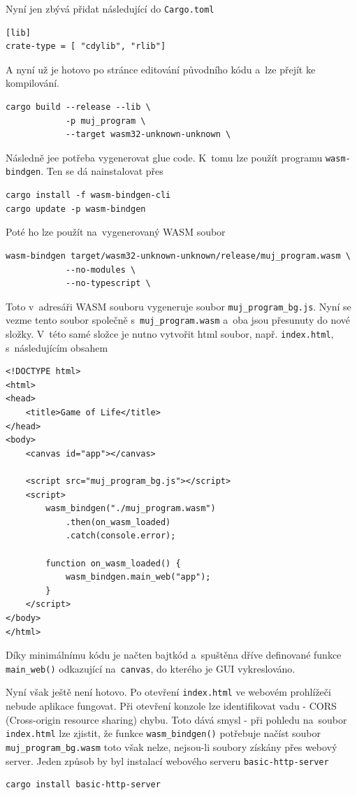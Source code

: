 \documentclass[a4paper, 12pt]{article} %
\newcommand{\rust}[1]{\texttt{#1}}
\begin{document}
		Nyní jen zbývá přidat následující do \texttt{Cargo.toml}
\begin{verbatim}
[lib]
crate-type = [ "cdylib", "rlib"]
		\end{verbatim}
		
		A nyní už je hotovo po stránce editování původního kódu a~lze přejít ke kompilování.
		\begin{verbatim}
cargo build --release --lib \
			-p muj_program \
			--target wasm32-unknown-unknown \
		\end{verbatim}
		
		Následně jee potřeba vygenerovat glue code. K~tomu lze použít programu \texttt{wasm-bindgen}. Ten se dá nainstalovat přes
		\begin{verbatim}
cargo install -f wasm-bindgen-cli
cargo update -p wasm-bindgen
		\end{verbatim}
		
		Poté ho lze použít na~vygenerovaný WASM soubor
		\begin{verbatim}
wasm-bindgen target/wasm32-unknown-unknown/release/muj_program.wasm \
			--no-modules \
			--no-typescript \
		\end{verbatim}
		
		Toto v~adresáři WASM souboru vygeneruje soubor \texttt{muj\_program\_bg.js}. Nyní se vezme tento soubor společně s~\texttt{muj\_program.wasm} a~oba jsou přesunuty do nové složky. V~této samé složce je nutno vytvořit html soubor, např. \texttt{index.html}, s~následujícím obsahem
		\begin{verbatim}
<!DOCTYPE html>
<html>
<head>
	<title>Game of Life</title>
</head>
<body>
	<canvas id="app"></canvas>

	<script src="muj_program_bg.js"></script>
	<script>
		wasm_bindgen("./muj_program.wasm")
			.then(on_wasm_loaded)
			.catch(console.error);

		function on_wasm_loaded() {
			wasm_bindgen.main_web("app");
		}
	</script>
</body>
</html>
		\end{verbatim}
		
		Díky minimálnímu kódu je načten bajtkód a~spuštěna dříve definované funkce \rust{main_web()} odkazující na~\texttt{canvas}, do kterého je GUI vykreslováno.
		
		Nyní však ještě není hotovo. Po otevření \texttt{index.html} ve webovém prohlížeči nebude aplikace fungovat. Při otevření konzole lze identifikovat vadu - CORS (Cross-origin resource sharing) chybu. Toto dává smysl - při pohledu na~soubor \texttt{index.html} lze zjistit, že funkce \rust{wasm_bindgen()} potřebuje načíst soubor \texttt{muj\_program\_bg.wasm} toto však nelze, nejsou-li soubory získány přes webový server. Jeden způsob by byl instalací webového serveru \texttt{basic-http-server}
		\begin{verbatim}
cargo install basic-http-server
		\end{verbatim}
		
\end{document}

